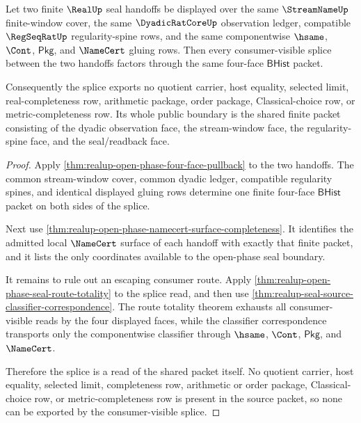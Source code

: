 \begin{theorem}
\label{thm:realup-open-phase-window-splice-nonescape}
Let two finite $\RealUp$ seal handoffs be displayed over the same
$\StreamNameUp$ finite-window cover, the same $\DyadicRatCoreUp$ observation
ledger, compatible $\RegSeqRatUp$ regularity-spine rows, and the same
componentwise $\hsame$, $\Cont$, $\mathsf{Pkg}$, and $\NameCert$ gluing rows.
Then every consumer-visible splice between the two handoffs factors through
the same four-face $\mathsf{BHist}$ packet.

Consequently the splice exports no quotient carrier, host equality, selected
limit, real-completeness row, arithmetic package, order package,
Classical-choice row, or metric-completeness row. Its whole public boundary is
the shared finite packet consisting of the dyadic observation face, the
stream-window face, the regularity-spine face, and the seal/readback face.
\end{theorem}
\begin{proof}
Apply \autoref{thm:realup-open-phase-four-face-pullback} to the two handoffs.
The common stream-window cover, common dyadic ledger, compatible regularity
spines, and identical displayed gluing rows determine one finite four-face
$\mathsf{BHist}$ packet on both sides of the splice.

Next use
\autoref{thm:realup-open-phase-namecert-surface-completeness}. It identifies
the admitted local $\NameCert$ surface of each handoff with exactly that
finite packet, and it lists the only coordinates available to the open-phase
seal boundary.

It remains to rule out an escaping consumer route. Apply
\autoref{thm:realup-open-phase-seal-route-totality} to the splice read, and
then use \autoref{thm:realup-seal-source-classifier-correspondence}. The route
totality theorem exhausts all consumer-visible reads by the four displayed
faces, while the classifier correspondence transports only the componentwise
classifier through $\hsame$, $\Cont$, $\mathsf{Pkg}$, and $\NameCert$.

Therefore the splice is a read of the shared packet itself. No quotient
carrier, host equality, selected limit, completeness row, arithmetic or order
package, Classical-choice row, or metric-completeness row is present in the
source packet, so none can be exported by the consumer-visible splice.
\end{proof}

